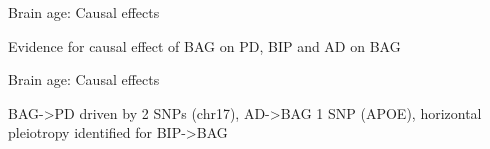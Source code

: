\documentclass[9pt]{beamer}
\begin{document}
	\begin{frame}{Brain age: Causal effects}
		\centering
		\vfill
		\vfill
        Evidence for causal effect of BAG on PD, BIP and AD on BAG
	\end{frame}

	\begin{frame}{Brain age: Causal effects}
		\centering
		\vfill
		\vfill
        BAG->PD driven by 2 SNPs (chr17), AD->BAG 1 SNP (APOE), horizontal pleiotropy identified for BIP->BAG
	\end{frame}
\end{document}
